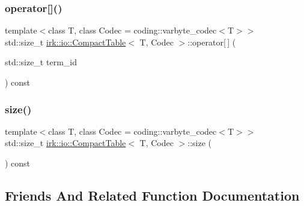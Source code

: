 \mbox{\label{classirk_1_1io_1_1CompactTable_a6107e174e27e7dd3c2f2fdc7a4397696}} 
\subsubsection{\texorpdfstring{operator[]()}{operator[]()}\hspace{0.1cm}{\footnotesize\ttfamily [2/2]}}
{\footnotesize\ttfamily template$<$class T, class Codec = coding\+::varbyte\+\_\+codec$<$\+T$>$$>$ \\
std\+::size\+\_\+t \mbox{\hyperlink{classirk_1_1io_1_1CompactTable}{irk\+::io\+::\+Compact\+Table}}$<$ T, Codec $>$\+::operator\mbox{[}$\,$\mbox{]} (\begin{DoxyParamCaption}\item[{std\+::size\+\_\+t}]{term\+\_\+id }\end{DoxyParamCaption}) const\hspace{0.3cm}{\ttfamily [inline]}}

\mbox{\label{classirk_1_1io_1_1CompactTable_a6b3516a5cb3593d2e1f85620ef7ae3fd}} 
\subsubsection{\texorpdfstring{size()}{size()}}
{\footnotesize\ttfamily template$<$class T, class Codec = coding\+::varbyte\+\_\+codec$<$\+T$>$$>$ \\
std\+::size\+\_\+t \mbox{\hyperlink{classirk_1_1io_1_1CompactTable}{irk\+::io\+::\+Compact\+Table}}$<$ T, Codec $>$\+::size (\begin{DoxyParamCaption}{ }\end{DoxyParamCaption}) const\hspace{0.3cm}{\ttfamily [inline]}}



\subsection{Friends And Related Function Documentation}
\mbox{\label{classirk_1_1io_1_1CompactTable_aca625eae690396584a3998222ddd856f}} 
